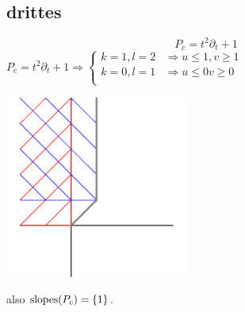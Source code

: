\subsection{drittes}

\[
  P_c=t^2\partial_t+1
\]
$
P_c=t^2\partial_t+1
\Rightarrow
\begin{cases}
  k=1, l=2 & \Rightarrow u \leq 1, v \geq 1\\
  k=0, l=1 & \Rightarrow u \leq 0  v \geq 0\\
\end{cases}
$
\begin{center}
  \includegraphics[width=6cm]{beispiele/img/c.png}
\end{center}

also $\operatorname{slopes}(P_c)=\{1\}$.

